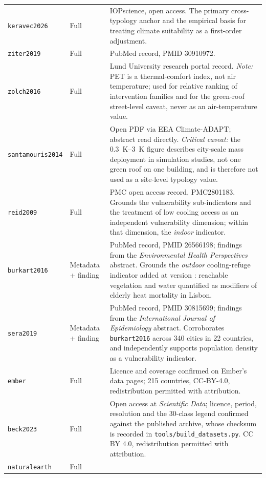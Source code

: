 \begin{longtable}{@{}l>{\raggedright\arraybackslash}p{34mm}
                    >{\raggedright\arraybackslash}p{66mm}@{}}
\texttt{keravec2026} & Full &
IOPscience, open access. The primary cross-typology anchor and the empirical
basis for treating climate suitability as a first-order adjustment. \\
\addlinespace
\texttt{ziter2019} & Full &
PubMed record, PMID 30910972. \\
\addlinespace
\texttt{zolch2016} & Full &
Lund University research portal record. \emph{Note:} PET is a thermal-comfort
index, not air temperature; used for relative ranking of intervention families
and for the green-roof street-level caveat, never as an air-temperature
value. \\
\addlinespace
\texttt{santamouris2014} & Full &
Open PDF via EEA Climate-ADAPT; abstract read directly. \emph{Critical
caveat:} the \SIrange{0.3}{3}{\kelvin} figure describes city-scale mass
deployment in simulation studies, not one green roof on one building, and is
therefore not used as a site-level typology value. \\
\addlinespace
\texttt{reid2009} & Full &
PMC open access record, PMC2801183. Grounds the vulnerability sub-indicators
and the treatment of low cooling access as an independent vulnerability
dimension; within that dimension, the \emph{indoor} indicator. \\
\addlinespace
\texttt{burkart2016} & Metadata + finding &
PubMed record, PMID 26566198; findings from the \emph{Environmental Health
Perspectives} abstract. Grounds the \emph{outdoor} cooling-refuge indicator
added at version \methver{}: reachable vegetation and water quantified as
modifiers of elderly heat mortality in Lisbon. \\
\addlinespace
\texttt{sera2019} & Metadata + finding &
PubMed record, PMID 30815699; findings from the \emph{International Journal of
Epidemiology} abstract. Corroborates \texttt{burkart2016} across 340 cities in
22 countries, and independently supports population density as a vulnerability
indicator. \\
\addlinespace
\texttt{ember} & Full &
Licence and coverage confirmed on Ember's data pages; 215 countries, CC-BY-4.0,
redistribution permitted with attribution. \\
\addlinespace
\texttt{beck2023} & Full &
Open access at \emph{Scientific Data}; licence, period, resolution and the
30-class legend confirmed against the published archive, whose checksum is
recorded in \texttt{tools/build\_datasets.py}. CC BY 4.0, redistribution
permitted with attribution. \\
\addlinespace
\texttt{naturalearth} & Full &

\end{longtable}
